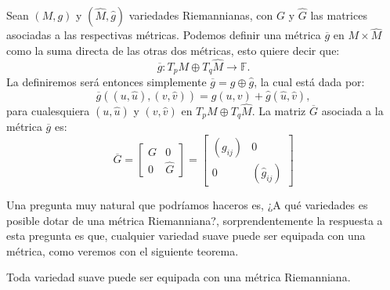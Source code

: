 \begin{example}\label{Ejemplo: Métrica - Producto de Variedades}
	Sean $(M,g)$ y $(\hat{M}, \hat{g})$ variedades Riemannianas, con $G$ y $\hat{G}$ las matrices asociadas a las respectivas métricas. Podemos definir una métrica $\overline{g}$ en $M \times \hat{M}$ como la suma directa de las otras dos métricas, esto quiere decir que:
	\[
		\overline{g}: T_{p}M \oplus T_{q}\hat{M} \to \mathbb{F}.
	\]
	La definiremos será entonces simplemente $\overline{g} = g \oplus \hat{g}$, la cual está dada por:
	\[
		\overline{g}((u,\hat{u}),(v,\hat{v})) = g(u,v) + \hat{g}(\hat{u},\hat{v}),
	\]
	para cualesquiera $(u,\hat{u})$ y $(v,\hat{v})$ en $T_{p}M \oplus T_{q}\hat{M}$. La matriz $\overline{G}$ asociada a la métrica $\overline{g}$ es:
	\[
		\overline{G} = \begin{bmatrix}
			G & 0       \\
			0 & \hat{G}
		\end{bmatrix} = \begin{bmatrix}
			(g_{ij}) & 0              \\
			0        & (\hat{g}_{ij})
		\end{bmatrix} \]
\end{example}

Una pregunta muy natural que podríamos haceros es, ¿A qué variedades es posible dotar de una métrica Riemanniana?, sorprendentemente la respuesta a esta pregunta es que, cualquier variedad suave puede ser equipada con una métrica, como veremos con el siguiente teorema.

\begin{theorem}
	Toda variedad suave puede ser equipada con una métrica Riemanniana.
\end{theorem}

